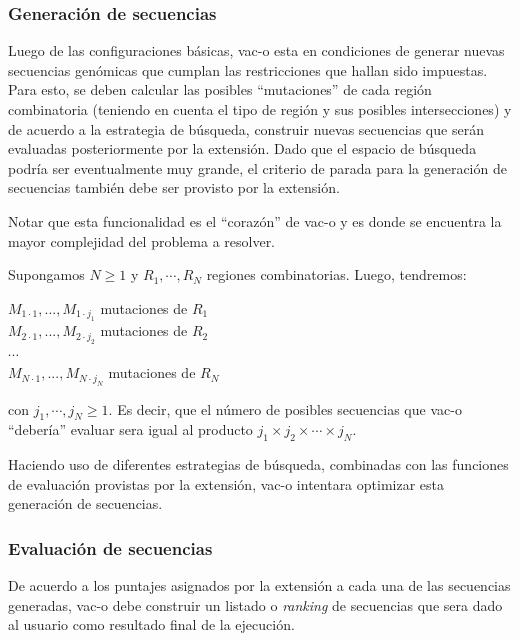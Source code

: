 \documentclass[10pt,a4paper]{article}
\begin{document}
  \subsubsection{Generaci\'on de secuencias}
  Luego de las configuraciones b\'asicas, vac-o esta en condiciones de generar nuevas secuencias gen\'omicas que cumplan las restricciones que hallan sido impuestas. Para esto, se deben calcular las posibles ``mutaciones'' de cada regi\'on combinatoria (teniendo en cuenta el tipo de regi\'on y sus posibles intersecciones) y de acuerdo a la estrategia de b\'usqueda, construir nuevas secuencias que ser\'an evaluadas posteriormente por la extensi\'on. Dado que el espacio de b\'usqueda podr\'ia ser eventualmente muy grande, el criterio de parada para la generaci\'on de secuencias tambi\'en debe ser provisto por la extensi\'on.

  Notar que esta funcionalidad es el ``coraz\'on'' de vac-o y es donde se encuentra la mayor complejidad del problema a resolver. 

  Supongamos $N \geqslant 1$ y $R_{1}, \cdots, R_{N}$ regiones combinatorias. Luego, tendremos: \\
  \begin{center}    
    $M_{1\cdot1},..., M_{1\cdot j_{1}}$ mutaciones de $R_{1}$\\ 
    $M_{2\cdot1},..., M_{2\cdot j_{2}}$ mutaciones de $R_{2}$\\
    $\cdots$ \\
    $M_{N\cdot1},..., M_{N\cdot j_{N}}$ mutaciones de $R_{N}$   
  \end{center}
  con $j_{1}, \cdots, j_{N} \geqslant 1$. Es decir, que el n\'umero de posibles secuencias que vac-o ``deber\'ia'' evaluar sera igual al producto $j_{1} \times j_{2} \times \cdots \times j_{N}$. 

  Haciendo uso de diferentes estrategias de b\'usqueda, combinadas con las funciones de evaluaci\'on provistas por la extensi\'on, vac-o intentara optimizar esta generaci\'on de secuencias.

  \subsubsection{Evaluaci\'on de secuencias}
  De acuerdo a los puntajes asignados por la extensi\'on a cada una de las secuencias generadas, vac-o debe construir un listado o \textit{ranking} de secuencias que sera dado al usuario como resultado final de la ejecuci\'on.
\end{document}
